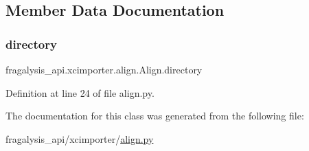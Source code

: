 \subsection{Member Data Documentation}
\mbox{\label{classfragalysis__api_1_1xcimporter_1_1align_1_1_align_aaa8ff46caee489ab4cab5279ac946bcc}} 
\subsubsection{\texorpdfstring{directory}{directory}}
{\footnotesize\ttfamily fragalysis\+\_\+api.\+xcimporter.\+align.\+Align.\+directory}



Definition at line 24 of file align.\+py.



The documentation for this class was generated from the following file\+:\begin{DoxyCompactItemize}
\item 
fragalysis\+\_\+api/xcimporter/\hyperlink{align_8py}{align.\+py}\end{DoxyCompactItemize}
